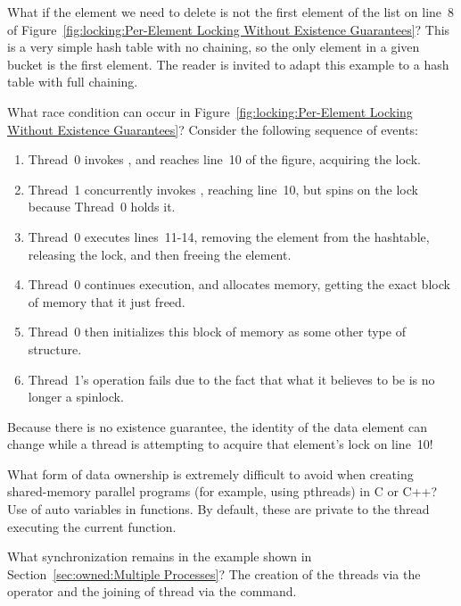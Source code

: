 \QuickQ{}
	What if the element we need to delete is not the first element
	of the list on line~8 of
	Figure~\ref{fig:locking:Per-Element Locking Without Existence Guarantees}?
\QuickA{}
	This is a very simple hash table with no chaining, so the only
	element in a given bucket is the first element.
	The reader is invited to adapt this example to a hash table with
	full chaining.

\QuickQ{}
	What race condition can occur in
	Figure~\ref{fig:locking:Per-Element Locking Without Existence Guarantees}?
\QuickA{}
	Consider the following sequence of events:
	\begin{enumerate}
	\item	Thread~0 invokes , and reaches line~10 of
		the figure, acquiring the lock.
	\item	Thread~1 concurrently invokes , reaching
		line~10, but spins on the lock because Thread~0 holds it.
	\item	Thread~0 executes lines~11-14, removing the element from
		the hashtable, releasing the lock, and then freeing the
		element.
	\item	Thread~0 continues execution, and allocates memory, getting
		the exact block of memory that it just freed.
	\item	Thread~0 then initializes this block of memory as some
		other type of structure.
	\item	Thread~1's  operation fails due to the
		fact that what it believes to be  is no longer
		a spinlock.
	\end{enumerate}
	Because there is no existence guarantee, the identity of the
	data element can change while a thread is attempting to acquire
	that element's lock on line~10!

\QuickQ{}
	What form of data ownership is extremely difficult
	to avoid when creating shared-memory parallel programs
	(for example, using pthreads) in C or C++?
\QuickA{}
	Use of auto variables in functions.
	By default, these are private to the thread executing the
	current function.

\QuickQ{}
	What synchronization remains in the example shown in
	Section~\ref{sec:owned:Multiple Processes}?
\QuickA{}
	The creation of the threads via the  \co{&} operator
	and the joining of thread via the  
	command.


